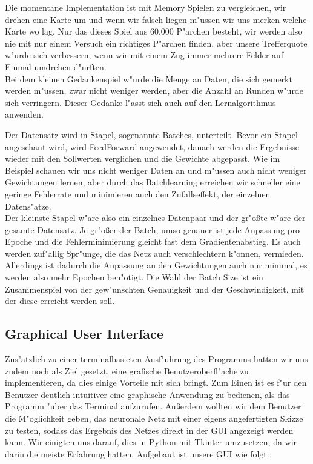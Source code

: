 \documentclass[12pt,a4paper]{scrartcl}
\begin{document}
Die momentane Implementation ist mit Memory Spielen zu vergleichen, wir drehen eine Karte um und wenn wir falsch liegen m"ussen wir uns merken welche Karte wo lag. Nur das dieses Spiel aus 60.000 P"archen besteht, wir werden also nie mit nur einem Versuch ein richtiges P"archen finden, aber unsere Trefferquote w"urde sich verbessern, wenn wir mit einem Zug immer mehrere Felder auf Einmal umdrehen d"urften.\\

Bei dem kleinen Gedankenspiel w"urde die Menge an Daten, die sich gemerkt werden m"ussen, zwar nicht weniger werden, aber die Anzahl an Runden w"urde sich verringern. Dieser Gedanke l"asst sich auch auf den Lernalgorithmus anwenden. \\

\pagebreak

Der Datensatz wird in Stapel, sogenannte Batches, unterteilt. Bevor ein Stapel angeschaut wird, wird FeedForward angewendet, danach werden die Ergebnisse wieder mit den Sollwerten verglichen und die Gewichte abgepasst. Wie im Beispiel schauen wir uns nicht weniger Daten an und m"ussen auch nicht weniger Gewichtungen lernen, aber durch das Batchlearning erreichen wir schneller eine geringe Fehlerrate und minimieren auch den Zufallseffekt, der einzelnen Datens"atze.\\

Der kleinste Stapel w"are also ein einzelnes Datenpaar und der gr"o\ss te w"are der gesamte Datensatz. Je gr"o\ss er der Batch, umso genauer ist jede Anpassung pro Epoche und die Fehlerminimierung gleicht fast dem Gradientenabstieg. Es auch werden zuf"allig Spr"unge, die das Netz auch verschlechtern k"onnen, vermieden. Allerdings ist dadurch die Anpassung an den Gewichtungen auch nur minimal, es werden also mehr Epochen ben"otigt. Die Wahl der Batch Size ist ein Zusammenspiel von der gew"unschten Genauigkeit und der Geschwindigkeit, mit der diese erreicht werden soll.\\

\subsection{Graphical User Interface}
Zus"atzlich zu einer terminalbasieten Ausf"uhrung des Programms hatten wir uns zudem noch als Ziel gesetzt, eine grafische Benutzeroberfl"ache zu implementieren, da dies einige Vorteile mit sich bringt.
Zum Einen ist es f"ur den Benutzer deutlich intuitiver eine graphische Anwendung zu bedienen, als das Programm "uber das Terminal aufzurufen. Au\ss erdem wollten wir dem Benutzer die M"oglichkeit geben, das neuronale Netz mit einer eigens angefertigten Skizze zu testen, sodass das Ergebnis des Netzes direkt in der GUI angezeigt werden kann. Wir einigten uns darauf, dies in Python mit Tkinter umzusetzen, da wir darin die meiste Erfahrung hatten. Aufgebaut ist unsere GUI wie folgt:\\
\end{document}
